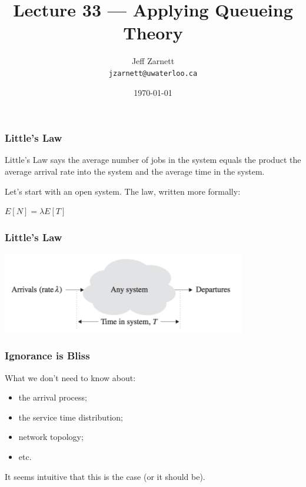 

\title{Lecture 33 --- Applying Queueing Theory}

\author{Jeff Zarnett\\ \small \texttt{jzarnett@uwaterloo.ca}}
\date{\today}




\begin{frame}
  \titlepage

 \end{frame}




\begin{frame}
\frametitle{Little's Law}

Little's Law says the average number of jobs in the system equals the product the average arrival rate into the system and the average time in the system. 

Let's start with an open system. The law, written more formally:

\begin{center}
	$E[N] = \lambda E[T]$
\end{center}

\end{frame}



\begin{frame}
\frametitle{Little's Law}

\begin{center}
	\includegraphics[width=0.8\textwidth]{images/littleslaw.png}
\end{center}

\end{frame}



\begin{frame}
\frametitle{Ignorance is Bliss}

\large
\begin{changemargin}{1.5cm}
What we don't need to know about:
\begin{itemize}
\item the arrival process;
\item the service time distribution;
\item network topology;
\item etc. 
\end{itemize}

It seems intuitive that this is the case (or it should be). 
\end{changemargin}

\end{frame}



